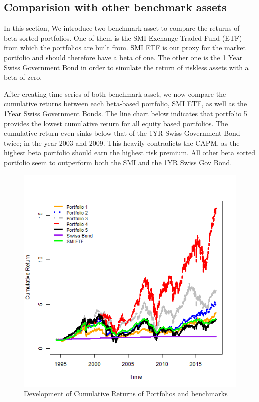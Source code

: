 \documentclass[12pt,a4paper]{article}
\begin{document}
\begin{justify}
\subsection{Comparision with other benchmark assets}
In this section, We introduce two benchmark asset to compare the returns of beta-sorted portfolios. One of them is the SMI Exchange Traded Fund (ETF) from which the portfolios are built from. SMI ETF is our proxy for the market portfolio and should therefore have a beta of one. The other one is the 1 Year Swiss Government Bond in order to simulate the return of riskless assets with a beta of zero. 

After creating time-series of both benchmark asset, we now compare the cumulative returns between each beta-based portfolio, SMI ETF, as well as the 1Year Swiss Government Bonds. The line chart below indicates that portfolio 5 provides the lowest cumulative return for all equity based portfolios. The cumulative return even sinks below that of the 1YR Swiss Government Bond twice; in the year 2003 and 2009. This heavily contradicts the CAPM, as the highest beta portfolio should earn the highest risk premium. All other beta sorted portfolio seem to outperform both the SMI and the 1YR Swiss Gov Bond.    
\begin{figure}[H]
\centering
\includegraphics[width=1\textwidth,height=0.8\textwidth]{Cumulative Returns with SMI&SGB.png}
\caption{Development of Cumulative Returns of Portfolios and benchmarks}
\label{fig:Development of Cumulative Returns of Portfolios and benchmarks}
\end{figure}



\end{justify}
\end{document}
